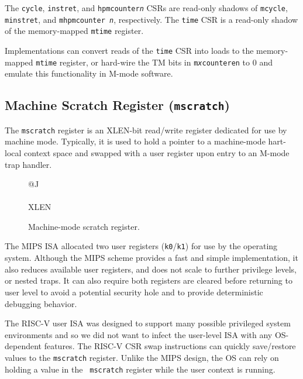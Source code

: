 The {\tt cycle}, {\tt instret}, and {\tt hpmcounter{\em n}} CSRs are
read-only shadows of {\tt mcycle}, {\tt minstret}, and {\tt mhpmcounter{\em
n}}, respectively.  The {\tt time} CSR is a read-only shadow of the
memory-mapped {\tt mtime} register.
\begin{commentary}
Implementations can convert reads of the {\tt time} CSR into loads to
the memory-mapped {\tt mtime} register, or hard-wire the TM bits in
{\tt m{\em x}counteren} to 0
and emulate this functionality in M-mode software.
\end{commentary}

\subsection{Machine Scratch Register ({\tt mscratch})}

The {\tt mscratch} register is an XLEN-bit read/write register
dedicated for use by machine mode.  Typically, it is used to hold a
pointer to a machine-mode hart-local context space and swapped with a
user register upon entry to an M-mode trap handler.

\begin{figure}[h!]
{\footnotesize
\begin{center}
\begin{tabular}{@{}J}
 \\
\hline
{} \\
\hline
XLEN \\
\end{tabular}
\end{center}
}
\vspace{-0.1in}
\caption{Machine-mode scratch register.}
\label{mscratchreg}
\end{figure}

\begin{commentary}
The MIPS ISA allocated two user registers ({\tt k0}/{\tt k1}) for use
by the operating system.  Although the MIPS scheme provides a fast and
simple implementation, it also reduces available user registers,  and
does not scale to further privilege levels, or nested traps.  It can
also require both registers are cleared before returning to user level
to avoid a potential security hole and to provide deterministic
debugging behavior.

The RISC-V user ISA was designed to support many possible privileged
system environments and so we did not want to infect the user-level
ISA with any OS-dependent features.  The RISC-V CSR swap instructions
can quickly save/restore values to the {\tt mscratch} register.
Unlike the MIPS design, the OS can rely on holding a value in the {\tt
  mscratch} register while the user context is running.
\end{commentary}


